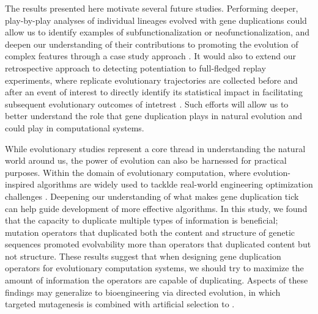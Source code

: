 The results presented here motivate several future studies.
Performing deeper, play-by-play analyses of individual lineages evolved with gene duplications could allow us to identify examples of subfunctionalization or neofunctionalization, and deepen our understanding of  their contributions to promoting the evolution of complex features through a case study approach \citep{mcphee2018detailed}.
It would also to extend our retrospective approach to detecting potentiation to full-fledged replay experiments, where replicate evolutionary trajectories are collected before and after an event of interest to directly identify its statistical impact in facilitating subsequent evolutionary outcomes of intetrest \citep{blount2018contingency,Ferguson2023}.
Such efforts will allow us to better understand the role that gene duplication plays in natural evolution and could play in computational systems.

While evolutionary studies represent a core thread in understanding the natural world around us, the power of evolution can also be harnessed for practical purposes.
Within the domain of evolutionary computation, where evolution-inspired algorithms are widely used to tacklde real-world engineering optimization challenges \citep{holland1992genetic}.
Deepening our understanding of what makes gene duplication tick can help guide development of more effective algorithms.
In this study, we found that the capacity to duplicate multiple types of information is beneficial; mutation operators that duplicated both the content and structure of genetic sequences promoted evolvability more than operators that duplicated content but not structure.
These results suggest that when designing gene duplication operators for evolutionary computation systems, we should try to maximize the amount of information the operators are capable of duplicating.
Aspects of these findings may generalize to bioengineering via directed evolution, in which targeted mutagenesis is combined with artificial selection to \citep{sandberg2019emergence}.

